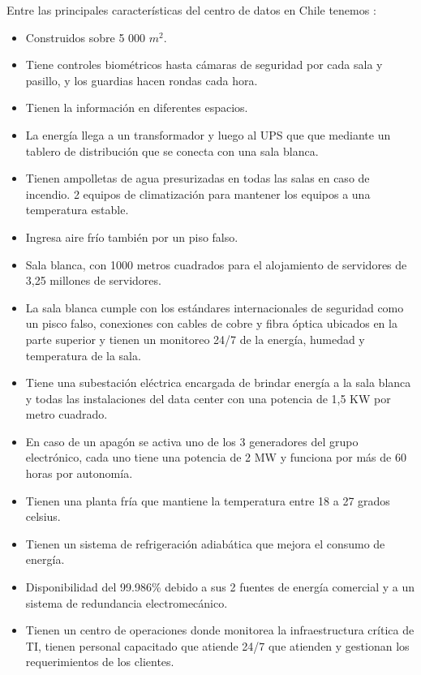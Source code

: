 \documentclass{article}
\begin{document}
Entre las principales características del centro de datos en Chile tenemos \citep{telefonicachile}:
\begin{itemize}
	\item Construidos sobre 5 000 $m^2$.
	\item Tiene controles biométricos hasta cámaras de seguridad por cada sala y pasillo, y los guardias hacen rondas cada hora.
	\item Tienen la información en diferentes espacios.
	\item La energía llega a un transformador y luego al UPS que que mediante un tablero de distribución que se conecta con una sala blanca.
	
	\item 	Tienen ampolletas de agua presurizadas en todas las salas en caso de incendio.
	2 equipos de climatización para mantener los equipos a una temperatura estable.
	
	\item 	Ingresa aire frío también por un piso falso.
	
	\item 	Sala blanca, con 1000 metros cuadrados para el alojamiento de servidores de 3,25 millones de servidores.
	
	\item 	La sala blanca cumple con los estándares internacionales de seguridad como un pisco falso, conexiones con cables de cobre y fibra óptica ubicados en la parte superior y tienen un monitoreo 24/7 de la energía, humedad y temperatura de la sala.
	
	\item  Tiene una subestación eléctrica encargada de brindar energía a la sala blanca y todas las instalaciones del data center con una potencia de 1,5 KW por metro cuadrado.
	
	\item En caso de un apagón se activa uno de los 3 generadores del grupo electrónico, cada uno tiene una potencia de 2 MW y funciona por más de 60 horas por autonomía.
	
	\item Tienen una planta fría que mantiene la temperatura entre 18 a 27 grados celsius.
	
	\item Tienen un sistema de refrigeración adiabática que mejora el consumo de energía. 
	
	\item 	Disponibilidad del 99.986\% debido a sus 2 fuentes de energía comercial y a un sistema de redundancia electromecánico.
	
	\item Tienen un centro de operaciones donde monitorea la infraestructura crítica de TI, tienen personal capacitado que atiende 24/7 que atienden y gestionan los requerimientos de los clientes.
\end{itemize}
	
\end{document}
